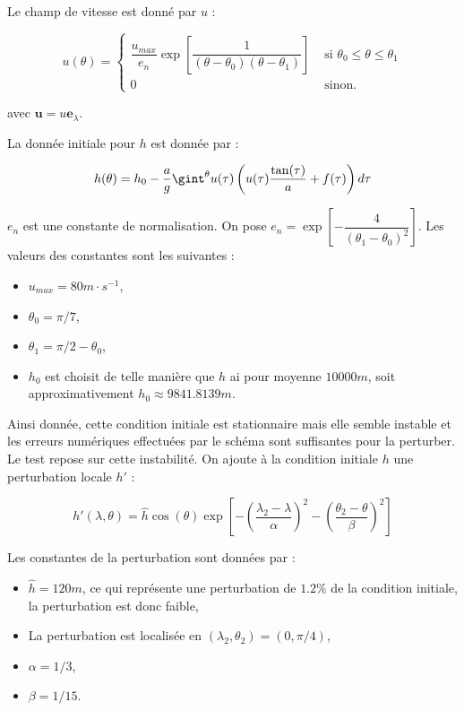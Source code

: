 Le champ de vitesse est donné par $u$ :

\begin{equation}
u(\theta) = \left\lbrace
\begin{array}{ll}
\dfrac{u_{max}}{e_n} \exp \left[ \dfrac{1}{(\theta-\theta_0)(\theta-\theta_1)} \right] & \text{ si } \theta_0 \leq \theta \leq \theta_1 \\
0 & \text{ sinon.}
\end{array}
\right.
\end{equation}

avec $\mathbf{u} = u \mathbf{e}_{\lambda}$.

La donnée initiale pour $h$ est donnée par :

\begin{equation}
h(\theta) = h_0 - \dfrac{a}{g} \gint^{\theta} u(\tau) \left( u(\tau) \dfrac{\tan (\tau)}{a} + f(\tau) \right) d\tau
\end{equation}



$e_n$ est une constante de normalisation. On pose $e_n = \exp\left[ - \dfrac{4}{(\theta_1-\theta_0)^2} \right]$. Les valeurs des constantes sont les suivantes :
\begin{itemize}
\item $u_{max}=80 m \cdot  \si{s^{-1}}$,
\item $\theta_0 = \pi/7$,
\item $\theta_1 = \pi/2 - \theta_0$,
\item $h_0$ est choisit de telle manière que $h$ ai pour moyenne $10000 \si{m}$, soit approximativement $h_0 \approx 9841.8139 \si{m}$.
\end{itemize}

Ainsi donnée, cette condition initiale est stationnaire mais elle semble instable et les erreurs numériques effectuées par le schéma sont suffisantes pour la perturber. Le test repose sur cette instabilité. On ajoute à la condition initiale $h$ une perturbation locale $h'$ :

\begin{equation}
h'(\lambda, \theta) = \hat{h} \cos ( \theta ) \exp \left[ - \left( \dfrac{\lambda_2 - \lambda}{\alpha} \right)^2 - \left( \dfrac{\theta_2 - \theta}{\beta} \right)^2 \right]
\end{equation}

Les constantes de la perturbation sont données par :
\begin{itemize}
\item $\hat{h} = 120m$, ce qui représente une perturbation de $1.2 \%$ de la condition initiale, la perturbation est donc faible,
\item La perturbation est localisée en $(\lambda_2, \theta_2) = (0, \pi/4)$,
\item $\alpha = 1/3$,
\item $\beta = 1/15$.
\end{itemize}

